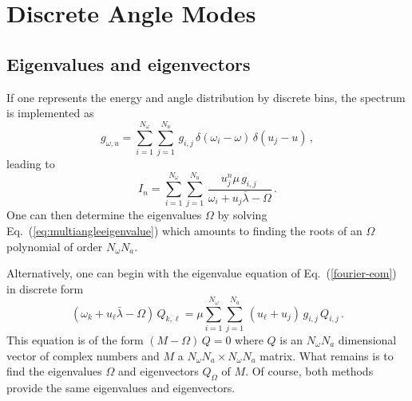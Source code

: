 \documentclass[twocolumn,prd,showpacs,
floatfix,preprintnumbers,nofootinbib]{revtex4}
\begin{document}
\section{Discrete Angle Modes}
\label{sec:fewmodes}

\subsection{Eigenvalues and eigenvectors}

If one represents the energy and angle distribution by discrete
bins, the spectrum is implemented as
\begin{equation}
g_{\omega,u}=\sum_{i=1}^{N_\omega}\sum_{j=1}^{N_a}\,
g_{i,j}\,\delta(\omega_i-\omega)\,\delta(u_j-u)\,,
\end{equation}
leading to
\begin{equation}
I_n=\sum_{i=1}^{N_\omega}\sum_{j=1}^{N_a}\,
\frac{u^n_j\mu\,g_{i,j}\,}{\omega_i+u_j\bar\lambda-\Omega}\,.
\end{equation}
One can then determine the eigenvalues $\Omega$ by solving
Eq.~(\ref{eq:multiangleeigenvalue}) which amounts to finding the
roots of an $\Omega$ polynomial of order $N_\omega N_a$.

Alternatively, one can begin with the eigenvalue equation of
Eq.~(\ref{fourier-eom}) in discrete form
\begin{equation}\label{fourier-eom2}
(\omega_k + u_\ell\bar\lambda- \Omega)\, Q_{k,\ell}=
\mu
\sum_{i=1}^{N_\omega}\sum_{j=1}^{N_a}\,
(u_\ell+u_{j})\,g_{i,j}\,Q_{i,j}\,.
\end{equation}
This equation is of the form $(M-\Omega)\,Q=0$ where $Q$ is an
$N_\omega N_a$ dimensional vector of complex numbers and $M$ a
$N_\omega N_a\times N_\omega N_a$ matrix. What remains is to find
the eigenvalues $\Omega$ and eigenvectors $Q_\Omega$ of $M$.
Of course, both methods  provide the same eigenvalues and eigenvectors.
\end{document}
